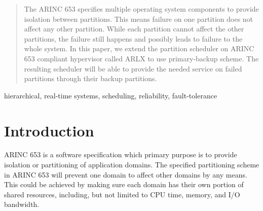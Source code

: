 \documentclass[conference]{IEEEtran}
\begin{document}




\maketitle

\begin{abstract}
	The ARINC 653 specifies multiple operating system components to provide isolation
	between partitions. This means failure on one partition does not affect any other
	partition.  While each partition cannot affect the other partitions, the failure still
	happens and possibly leads to failure to the whole system. In this paper, we extend the
	partition scheduler on ARINC 653 compliant hypervisor called ARLX to use primary-backup
	scheme. The resulting scheduler will be able to provide the needed service on failed
	partitions through their backup partitions.
\end{abstract}

\vspace{10pt}

\renewcommand\IEEEkeywordsname{Keywords}
\begin{IEEEkeywords}
	hierarchical, real-time systems, scheduling, reliability, fault-tolerance
\end{IEEEkeywords}

%
\IEEEpeerreviewmaketitle



\section{Introduction}

ARINC 653 is a software specification which primary purpose is to provide isolation or
partitioning of application domains. The specified partitioning scheme in ARINC 653 will prevent
one domain to affect other domains by any means. This could be achieved by making sure each
domain has their own portion of shared resources, including, but not limited to CPU time,
memory, and I/O bandwidth.
\end{document}
